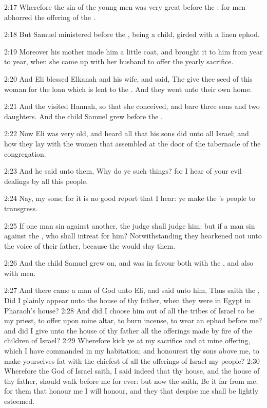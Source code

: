 2:17 Wherefore the sin of the young men was very great before the \LORD: for men abhorred the offering of the \LORD.

2:18 But Samuel ministered before the \LORD, being a child, girded with a linen ephod.

2:19 Moreover his mother made him a little coat, and brought it to him from year to year, when she came up with her husband to offer the yearly sacrifice.

2:20 And Eli blessed Elkanah and his wife, and said, The \LORD give thee seed of this woman for the loan which is lent to the \LORD. And they went unto their own home.

2:21 And the \LORD visited Hannah, so that she conceived, and bare three sons and two daughters. And the child Samuel grew before the \LORD.

2:22 Now Eli was very old, and heard all that his sons did unto all Israel; and how they lay with the women that assembled at the door of the tabernacle of the congregation.

2:23 And he said unto them, Why do ye such things? for I hear of your evil dealings by all this people.

2:24 Nay, my sons; for it is no good report that I hear: ye make the \LORD's people to transgress.

2:25 If one man sin against another, the judge shall judge him: but if a man sin against the \LORD, who shall intreat for him? Notwithstanding they hearkened not unto the voice of their father, because the \LORD would slay them.

2:26 And the child Samuel grew on, and was in favour both with the \LORD, and also with men.

2:27 And there came a man of God unto Eli, and said unto him, Thus saith the \LORD, Did I plainly appear unto the house of thy father, when they were in Egypt in Pharaoh's house?  2:28 And did I choose him out of all the tribes of Israel to be my priest, to offer upon mine altar, to burn incense, to wear an ephod before me? and did I give unto the house of thy father all the offerings made by fire of the children of Israel?  2:29 Wherefore kick ye at my sacrifice and at mine offering, which I have commanded in my habitation; and honourest thy sons above me, to make yourselves fat with the chiefest of all the offerings of Israel my people?  2:30 Wherefore the \LORD God of Israel saith, I said indeed that thy house, and the house of thy father, should walk before me for ever: but now the \LORD saith, Be it far from me; for them that honour me I will honour, and they that despise me shall be lightly esteemed.

